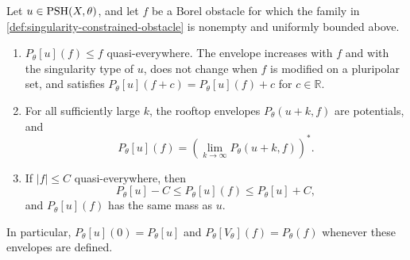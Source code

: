 \begin{proposition}\label{prop:singularity-obstacle-calculus}
Let $u\in\mathrm{PSH}(X,\theta)$, and let $f$ be a Borel obstacle for which the family in \cref{def:singularity-constrained-obstacle} is nonempty and uniformly bounded above.
\begin{enumerate}
 \item $P_\theta[u](f)\leq f$ quasi-everywhere. The envelope increases with $f$ and with the singularity type of $u$, does not change when $f$ is modified on a pluripolar set, and satisfies $P_\theta[u](f+c)=P_\theta[u](f)+c$ for $c\in\mathbb R$.
 \item For all sufficiently large $k$, the rooftop envelopes $P_\theta(u+k,f)$ are potentials, and
 \[
  P_\theta[u](f)=\left(\lim_{k\to\infty}P_\theta(u+k,f)\right)^*.
 \]
 \item If $|f|\leq C$ quasi-everywhere, then
 \[
  P_\theta[u]-C\leq P_\theta[u](f)\leq P_\theta[u]+C,
 \]
 and $P_\theta[u](f)$ has the same mass as $u$.
\end{enumerate}
In particular, $P_\theta[u](0)=P_\theta[u]$ and $P_\theta[V_\theta](f)=P_\theta(f)$ whenever these envelopes are defined.
\end{proposition}
